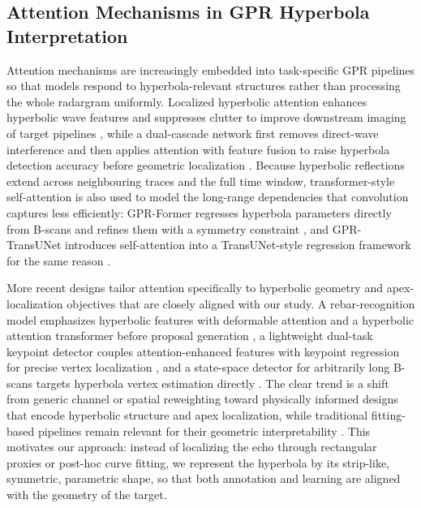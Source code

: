 \documentclass[lettersize,journal]{IEEEtran}
\begin{document}
\subsection{Attention Mechanisms in GPR Hyperbola Interpretation}
Attention mechanisms are increasingly embedded into task-specific GPR pipelines so that models respond to hyperbola-relevant structures rather than processing the whole radargram uniformly. Localized hyperbolic attention enhances hyperbolic wave features and suppresses clutter to improve downstream imaging of target pipelines \cite{liu2025hyperbolic}, while a dual-cascade network first removes direct-wave interference and then applies attention with feature fusion to raise hyperbola detection accuracy before geometric localization \cite{wang2025underground}. Because hyperbolic reflections extend across neighbouring traces and the full time window, transformer-style self-attention is also used to model the long-range dependencies that convolution captures less efficiently: GPR-Former regresses hyperbola parameters directly from B-scans and refines them with a symmetry constraint \cite{jin2024gprformer}, and GPR-TransUNet introduces self-attention into a TransUNet-style regression framework for the same reason \cite{ge2024gprtransunet}.

More recent designs tailor attention specifically to hyperbolic geometry and apex-localization objectives that are closely aligned with our study. A rebar-recognition model emphasizes hyperbolic features with deformable attention and a hyperbolic attention transformer before proposal generation \cite{li2025rebar}, a lightweight dual-task keypoint detector couples attention-enhanced features with keypoint regression for precise vertex localization \cite{hou2025endtoend}, and a state-space detector for arbitrarily long B-scans targets hyperbola vertex estimation directly \cite{lan2024statespace}. The clear trend is a shift from generic channel or spatial reweighting toward physically informed designs that encode hyperbolic structure and apex localization, while traditional fitting-based pipelines remain relevant for their geometric interpretability \cite{lei2019autohyperbola}. This motivates our approach: instead of localizing the echo through rectangular proxies or post-hoc curve fitting, we represent the hyperbola by its strip-like, symmetric, parametric shape, so that both annotation and learning are aligned with the geometry of the target.
\end{document}

